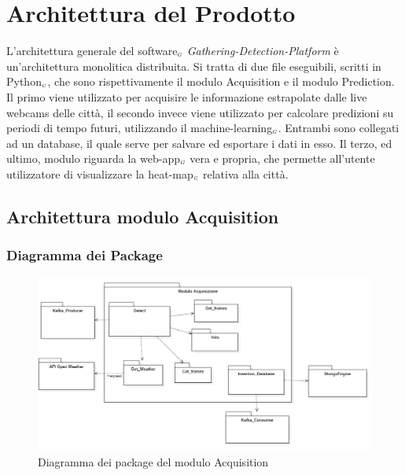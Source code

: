 \chapter{Architettura del Prodotto}\label{ArchitetturaDelProdotto}
L'architettura generale del software$_{\scaleto{G}{3pt}}$ \textit{Gathering-Detection-Platform} è un'architettura monolitica distribuita.
Si tratta di due file eseguibili, scritti in Python$_{\scaleto{G}{3pt}}$, che sono rispettivamente il modulo Acquisition e il modulo Prediction.
Il primo viene utilizzato per acquisire le informazione estrapolate dalle live webcams delle città, il secondo invece viene utilizzato per calcolare predizioni su periodi di tempo futuri, utilizzando il machine-learning$_{\scaleto{G}{3pt}}$.
Entrambi sono collegati ad un database, il quale serve per salvare ed esportare i dati in esso.
Il terzo, ed ultimo, modulo riguarda la web-app$_{\scaleto{G}{3pt}}$ vera e propria, che permette all'utente utilizzatore di visualizzare la heat-map$_{\scaleto{G}{3pt}}$ relativa alla città.


\section{Architettura modulo Acquisition}
\subsection{Diagramma dei Package}
\begin{figure}[H]
  \begin{center}
    \includegraphics[scale=0.6]{../immagini/diag_PB/diag_pack_acqui.png}
    \caption{Diagramma dei package del modulo Acquisition}
  \end{center}
\end{figure}

